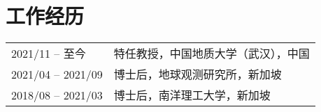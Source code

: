 \section*{工作经历}
\begin{tabular}{p{} p{}}
2021/11 -- 至今 & 特任教授，中国地质大学（武汉），中国 \\
2021/04 -- 2021/09 & 博士后，地球观测研究所，新加坡 \\
2018/08 -- 2021/03 & 博士后，南洋理工大学，新加坡 \\
\end{tabular}
